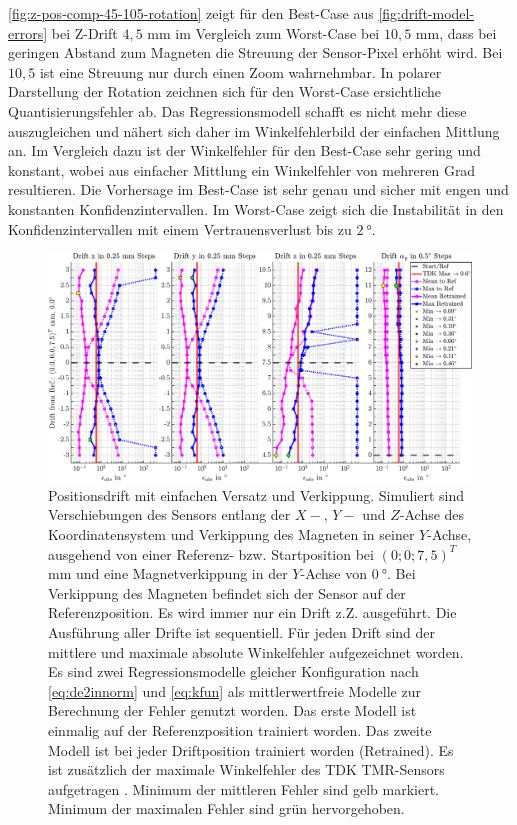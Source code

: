 \clearpage


\autoref{fig:z-pos-comp-45-105-rotation} zeigt für den Best-Case aus \autoref{fig:drift-model-errors} bei Z-Drift $4,5$ mm im Vergleich zum Worst-Case bei $10,5$ mm, dass bei geringen Abstand zum Magneten die Streuung der Sensor-Pixel erhöht wird. Bei $10,5$ ist eine Streuung nur durch einen Zoom wahrnehmbar. In polarer Darstellung der Rotation zeichnen sich für den Worst-Case ersichtliche Quantisierungsfehler ab. Das Regressionsmodell schafft es nicht mehr diese auszugleichen und nähert sich daher im Winkelfehlerbild der einfachen Mittlung an. Im Vergleich dazu ist der Winkelfehler für den Best-Case sehr gering und konstant, wobei aus einfacher Mittlung ein Winkelfehler von mehreren Grad resultieren. Die Vorhersage im Best-Case ist sehr genau und sicher mit engen und konstanten Konfidenzintervallen. Im Worst-Case zeigt sich die Instabilität in den Konfidenzintervallen mit einem Vertrauensverlust bis zu $\SI{2}{\degree}$.


\clearpage
\begin{landscape}
\begin{figure}[tbph]
	\centering
	\includegraphics[width=.8\linewidth]{chapters/images/4-EuOExp/Drift-Model-Errors}
	\caption[Positionsdrift mit einfachen Versatz und Verkippung]{Positionsdrift mit einfachen Versatz und Verkippung. Simuliert sind Verschiebungen des Sensors entlang der $X-$, $Y-$ und $Z$-Achse des Koordinatensystem und Verkippung des Magneten in seiner $Y$-Achse, ausgehend von einer Referenz- bzw. Startposition bei $(0;0;7,5)^T$ mm und eine Magnetverkippung in der $Y$-Achse von $\SI{0}{\degree}$. Bei Verkippung des Magneten befindet sich der Sensor auf der Referenzposition. Es wird immer nur ein Drift z.Z. ausgeführt. Die Ausführung aller Drifte ist sequentiell. Für jeden Drift sind der mittlere und maximale absolute Winkelfehler aufgezeichnet worden. Es sind zwei Regressionsmodelle gleicher Konfiguration nach \autoref{eq:de2innorm} und \autoref{eq:kfun} als mittlerwertfreie Modelle zur Berechnung der Fehler genutzt worden. Das erste Modell ist einmalig auf der Referenzposition trainiert worden. Das zweite Modell ist bei jeder Driftposition trainiert worden (Retrained). Es ist zusätzlich der maximale Winkelfehler des TDK TMR-Sensors aufgetragen \cite{TDK2016}. Minimum der mittleren Fehler sind gelb markiert. Minimum der maximalen Fehler sind grün hervorgehoben.}
	\label{fig:drift-model-errors}
\end{figure}
\end{landscape}


